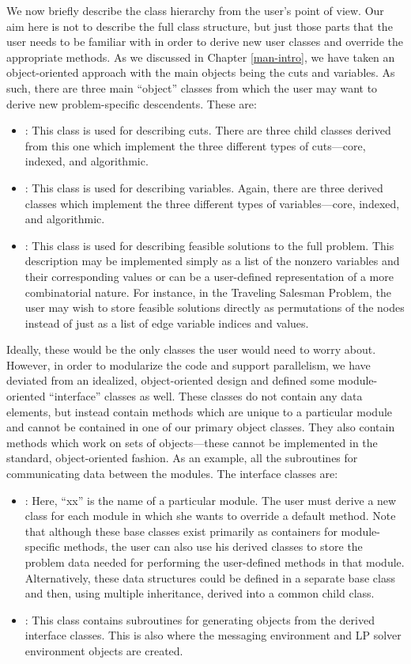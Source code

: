 We now briefly describe the class hierarchy from the user's point of view. Our
aim here is not to describe the full class structure, but just those parts
that the user needs to be familiar with in order to derive new user classes
and override the appropriate methods. As we discussed in Chapter
\ref{man-intro}, we have taken an object-oriented approach with the main
objects being the cuts and variables. As such, there are three main
``object'' classes from which the user may want to derive new
problem-specific descendents. These are:
\begin{itemize}
\item {}: This class is used for describing cuts. There are three
  child classes derived from this one which implement the three
  different types of cuts---core, indexed, and algorithmic.
\item {}: This class is used for describing variables. Again,
  there 
  are three derived classes which implement the three different types
  of variables---core, indexed, and algorithmic.
\item {}: This class is used for describing feasible
  solutions to the full problem. This description may be implemented
  simply as a list of the nonzero variables and their corresponding
  values or can be a user-defined representation of a more
  combinatorial nature. For instance, in the Traveling Salesman
  Problem, the user may wish to store feasible solutions directly as
  permutations of the nodes instead of just as a list of edge variable
  indices and values.
\end{itemize}
Ideally, these would be the only classes the user would need to worry
about. However, in order to modularize the code and support
parallelism, we have deviated from an idealized, object-oriented
design and defined some module-oriented ``interface'' classes as well.
These classes do not contain any data elements, but instead contain
methods which are unique to a particular module and cannot be
contained in one of our primary object classes. They also contain
methods which work on sets of objects---these cannot be implemented in
the standard, object-oriented fashion. As an example, all the
subroutines for communicating data between the modules. The interface
classes are:
\begin{itemize}
\item {}: Here, ``xx'' is the name of a particular module.
  The 
  user must derive a new class for each module in which she wants to
  override a default method. Note that although these base classes
  exist primarily as containers for module-specific methods, the user
  can also use his derived classes to store the problem data needed
  for performing the user-defined methods in that module.
  Alternatively, these data structures could be defined in a separate
  base class and then, using multiple inheritance, derived into a
  common child class.
\item {}: This class contains subroutines for generating
  objects from the derived interface classes. This is also where the
  messaging environment and LP solver environment objects are created.
\end{itemize}
